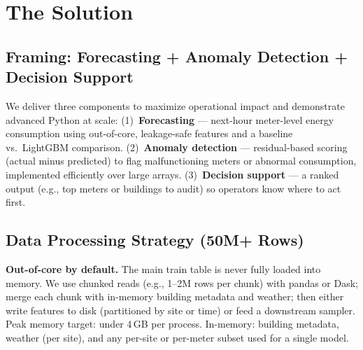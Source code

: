 
\section{The Solution}

\subsection{Framing: Forecasting + Anomaly Detection + Decision Support}
We deliver three components to maximize operational impact and demonstrate advanced Python at scale: (1)~\textbf{Forecasting} --- next-hour meter-level energy consumption using out-of-core, leakage-safe features and a baseline vs.\ LightGBM comparison. (2)~\textbf{Anomaly detection} --- residual-based scoring (actual minus predicted) to flag malfunctioning meters or abnormal consumption, implemented efficiently over large arrays. (3)~\textbf{Decision support} --- a ranked output (e.g., top meters or buildings to audit) so operators know where to act first.

\subsection{Data Processing Strategy (50M+ Rows)}
\textbf{Out-of-core by default.} The main train table is never fully loaded into memory. We use chunked reads (e.g., 1--2M rows per chunk) with pandas or Dask; merge each chunk with in-memory building metadata and weather; then either write features to disk (partitioned by site or time) or feed a downstream sampler. Peak memory target: under 4\,GB per process. In-memory: building metadata, weather (per site), and any per-site or per-meter subset used for a single model.

